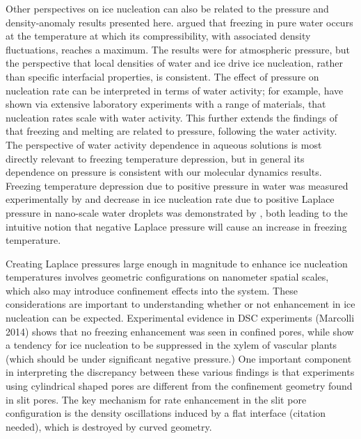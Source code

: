 \documentclass[journal abbreviation, manuscript]{copernicus}
\begin{document}
Other perspectives on ice nucleation can also be related to the pressure and density-anomaly results presented here. \citet{baker2004new} argued that freezing in pure water occurs at the temperature at which its compressibility, with associated density fluctuations, reaches a maximum. The results were for atmospheric pressure, but the perspective that local densities of water and ice drive ice nucleation, rather than specific interfacial properties, is consistent. The effect of pressure on nucleation rate can be interpreted in terms of water activity; for example, \citep{knopf2013water} have shown via extensive laboratory experiments with a range of materials, that nucleation rates scale with water activity. This further extends the findings of \citet{koop2000water} that freezing and melting are related to pressure, following the water activity. The perspective of water activity dependence in aqueous solutions is most directly relevant to freezing temperature depression, but in general its dependence on pressure is consistent with our molecular dynamics results. Freezing temperature depression due to positive pressure in water was measured experimentally by \citet{kanno1975} and decrease in ice nucleation rate due to positive Laplace pressure in nano-scale water droplets was demonstrated by \citet{Li2013}, both leading to the intuitive notion that negative Laplace pressure will cause an increase in freezing temperature.

Creating Laplace pressures large enough in magnitude to enhance ice nucleation temperatures involves geometric configurations on nanometer spatial scales, which also may introduce confinement effects into the system. These considerations are important to understanding whether or not enhancement in ice nucleation can be expected. Experimental evidence in DSC experiments (Marcolli 2014) shows that no freezing enhancement was seen in confined pores, while \citet{lintunen2013anatomical} show a tendency for ice nucleation to be suppressed in the xylem of vascular plants (which should be under significant negative pressure.) One important component in interpreting the discrepancy between these various findings is that experiments using cylindrical shaped pores are different from the confinement geometry found in slit pores. The key mechanism for rate enhancement in the slit pore configuration is the density oscillations induced by a flat interface (citation needed), which is destroyed by curved geometry.
\end{document}
